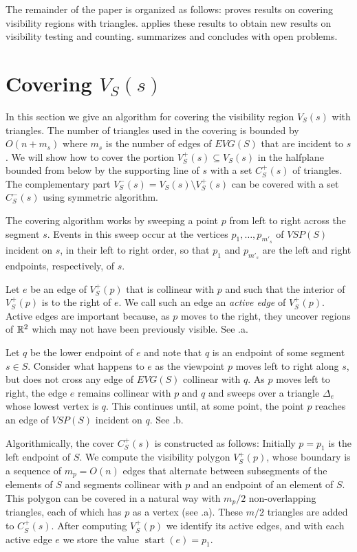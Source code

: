 \documentclass{patmorin}
\newcommand{\EVG}{\mathit{EVG}}
\newcommand{\VSP}{\mathit{VSP}}
\DeclareMathOperator{\start}{start}
\begin{document}
The remainder of the paper is organized as follows:  
proves results on covering visibility regions with triangles.
 applies these results to obtain new results on
visibility testing and counting.  summarizes and
concludes with open problems.

\section{Covering $V_S(s)$}

In this section we give an algorithm for covering the visibility region
$V_S(s)$ with triangles.  The number of triangles used in the covering is
bounded by $O(n+m_s)$ where $m_s$ is the number of edges of $\EVG(S)$ that
are incident to $s$.  We will show how to cover the portion
$V^+_S(s)\subseteq V_S(s)$ in the halfplane bounded from below by the
supporting line of $s$ with a set $C^+_S(s)$ of triangles.  The
complementary part $V^-_S(s)=V_S(s)\setminus V^+_S(s)$ can be covered with
a set $C^-_S(s)$ using symmetric algorithm.

The covering algorithm works by sweeping a point $p$ from left to right
across the segment $s$.  Events in this sweep occur at the vertices
$p_1,\ldots,p_{m'_s}$ of $\VSP(S)$ incident on $s$, in their left to right
order, so that $p_1$ and $p_{m'_s}$ are the left and right endpoints,
respectively, of $s$.

Let $e$ be an edge of $V^+_S(p)$ that is collinear with $p$ and such that the
interior of $V^+_S(p)$ is to the right of $e$. We call such an edge an
\emph{active edge} of $V^+_S(p)$.  Active edges are important because, as $p$
moves to the right, they uncover regions of $\mathbb{R}^2$ which may not have been
previously visible.  See .a.

Let $q$ be the lower endpoint of $e$ and note that $q$ is an endpoint of
some segment $s\in S$. Consider what happens to $e$ as the viewpoint $p$
moves left to right along $s$, but does not cross any edge of $\EVG(S)$
collinear with $q$.  As $p$ moves left to right, the edge $e$ remains
collinear with $p$ and $q$ and sweeps over a triangle $\Delta_e$ whose
lowest vertex is $q$.  This continues until, at some point, the point $p$
reaches an edge of $\VSP(S)$ incident on $q$.   See .b.

Algorithmically, the cover $C^+_S(s)$ is constructed as follows: Initially
$p=p_1$ is the left endpoint of $S$.  We compute the visibility polygon
$V^+_S(p)$, whose boundary is a sequence of $m_p=O(n)$ edges that alternate
between subsegments of the elements of $S$ and segments collinear with $p$
and an endpoint of an element of $S$.  This polygon can be covered in a
natural way with $m_p/2$ non-overlapping triangles, each of which has $p$
as a vertex (see .a). These $m/2$ triangles are added to
$C^+_S(s)$.  After computing $V^+_S(p)$ we identify its active edges, and with
each active edge $e$ we store the value $\start(e)=p_1$.
\end{document}
